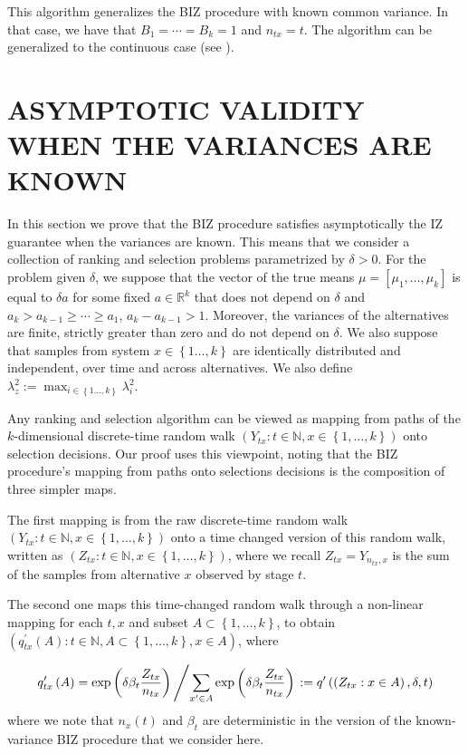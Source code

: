 \documentclass{wscpaperproc}
\theoremstyle{wsc}
\begin{document}
This algorithm generalizes the BIZ procedure with known common variance. In that case, we have that $B_1=\cdots=B_k=1$ and $n_{tx}=t$. The algorithm can be generalized to the continuous case (see  ). 

\section{ASYMPTOTIC VALIDITY WHEN THE VARIANCES ARE KNOWN}
\label{proof}

In this section we prove that the BIZ procedure satisfies asymptotically the IZ guarantee
when the variances are known. This means that we consider a collection of
ranking and selection problems parametrized by $\delta>0$.  
For the problem given $\delta$, we suppose that the vector of the true means
$\mu=\left[\mu_{1},\ldots,\mu_{k}\right]$ is equal to $\delta a$ for some fixed $a\in\mathbb{R}^{k}$ that
does not depend on $\delta$ and $a_{k}>a_{k-1}\geq \cdots \geq a_{1}$, $a_{k}-a_{k-1}>1$.
Moreover, the variances of the alternatives are finite, strictly greater than zero and do not depend on $\delta$.
We also suppose that samples from system $x\in\left\{ 1\ldots,k\right\} $ are identically distributed
and independent, over time and across alternatives. We also define
$\lambda_{z}^{2}:=\max_{i\in\left\{ 1\ldots,k\right\} }\lambda_{i}^{2}$.

Any ranking and selection algorithm can be viewed as mapping from
paths of the $k$-dimensional discrete-time random walk $\left(Y_{tx}:t\in\mathbb{N},x\in\left\{ 1,\ldots,k\right\} \right)$
onto selection decisions. 
Our proof uses this viewpoint, noting that 
the BIZ procedure's mapping from paths onto
selections decisions is the composition of three
simpler maps.

The first mapping is from the raw discrete-time random walk $\left(Y_{tx}:t\in\mathbb{N},x\in\left\{ 1,\ldots,k\right\} \right)$
onto a time changed version of this random walk, written as $\left(Z_{tx}:t\in\mathbb{N},x\in\left\{ 1,\ldots,k\right\} \right)$,
where we recall $Z_{tx}=Y_{n_{tx},x}$ is the sum of
the samples from alternative $x$ observed by stage $t$.

The second one maps this time-changed random walk through a non-linear
mapping for each $t,x$ and subset $A\subset\left\{ 1,\ldots,k\right\} $,
to obtain $\left(q_{tx}^{'}\left(A\right):t\in\mathbb{N},A\subset\left\{ 1,\ldots,k\right\} ,x\in A\right)$,
where

\[
q'_{tx}\left(A\right)=\mbox{exp}\left(\delta\beta_{t}\frac{Z_{tx}}{n_{tx}}\right)\left/\sum_{x'\in A}\mbox{exp}\left(\delta\beta_{t}\frac{Z_{tx}}{n_{tx}}\right)\right.:=q'\left(\left(Z_{tx}:x\in A\right),\delta,t\right)
\]
where we note that $n_{x}\left(t\right)$ and $\beta_{t}$ are deterministic
in the version of the known-variance BIZ procedure that we consider
here.
\end{document}

